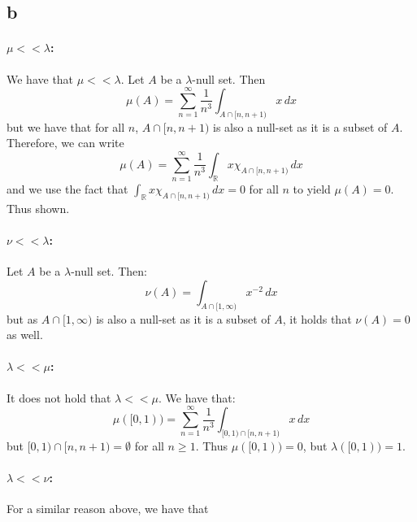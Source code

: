 \documentclass{article}
\theoremstyle{definition}
\numberwithin{theorem}{section}
\numberwithin{equation}{section}
\begin{document}
\subsection{b}
\paragraph{$\mu <<\lambda$:}

We have that $\mu <<\lambda$. Let $A$ be a $\lambda$-null set. Then
\begin{equation}
	\mu(A) = \sum_{n = 1}^{\infty} \frac{1}{n^3} \int_{A\cap [n, n + 1)} x \, dx 
\end{equation}
but we have that for all $n$, $A\cap [n, n + 1)$ is also a null-set as it is a subset of $A$. Therefore, we can write
\begin{equation}
	\mu(A) = \sum_{n = 1}^{\infty} \frac{1}{n^3} \int_{\mathbb{R}} x \chi_{A\cap [n, n + 1)} \, dx 
\end{equation}
and we use the fact that $\int_{\mathbb{R}} x \chi_{A\cap [n, n + 1)} \, dx  = 0$ for all $n$ to yield $\mu(A) = 0$. Thus shown.

\paragraph{$\nu <<\lambda$:}

Let $A$ be a $\lambda$-null set. Then:
\begin{equation}
	\nu(A) = \int_{A \cap [1, \infty)} x^{-2} \, dx
\end{equation}
but as $A \cap [1, \infty)$ is also a null-set as it is a subset of $A$, it holds that $\nu(A) = 0$ as well. 

\paragraph{$\lambda << \mu$:}
It does not hold that $\lambda << \mu$. We have that:
\begin{equation}
	\mu([0, 1)) = 
	\sum_{n = 1}^{\infty} \frac{1}{n^3} \int_{[0, 1)\cap [n, n + 1)} x\, dx 
\end{equation}
but $[0, 1)\cap [n, n + 1) = \emptyset$ for all $n \geq 1$. Thus $\mu([0, 1)) = 0$, but $\lambda([0, 1)) = 1$. 

\paragraph{$\lambda << \nu$:}
For a similar reason above, we have that
\end{document}
